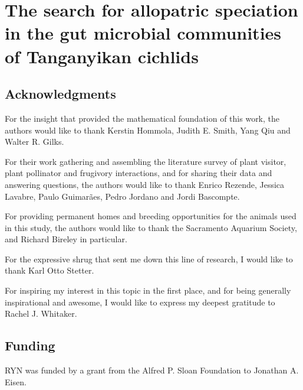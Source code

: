 
\chapter{The search for allopatric speciation in the gut microbial communities of Tanganyikan cichlids}








\section{Acknowledgments}

For the insight that provided the mathematical foundation of this work, the authors would like to thank Kerstin Hommola, Judith E. Smith, Yang Qiu and Walter R. Gilks.

For their work gathering and assembling the literature survey of plant visitor, plant pollinator and frugivory interactions, and for sharing their data and answering questions, the authors would like to thank Enrico Rezende, Jessica Lavabre, Paulo Guimar{\~a}es, Pedro Jordano and Jordi Bascompte.

For providing permanent homes and breeding opportunities for the animals used in this study, the authors would like to thank the Sacramento Aquarium Society, and Richard Bireley in particular.

For the expressive shrug that sent me down this line of research, I would like to thank Karl Otto Stetter.

For inspiring my interest in this topic in the first place, and for being generally inspirational and awesome, I would like to express my deepest gratitude to Rachel J. Whitaker.


\section{Funding}

RYN was funded by a grant from the Alfred P. Sloan Foundation to Jonathan A. Eisen. 

\printbibliography[heading=subbibliography]

